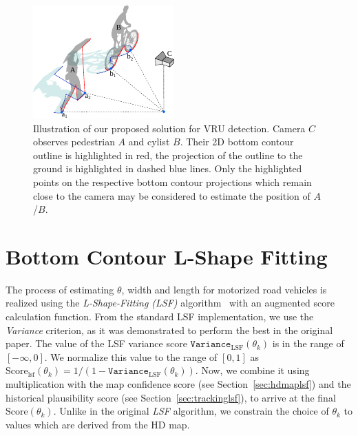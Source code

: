 \begin{figure}[htb]
    \centering
    \includegraphics[width=0.8\linewidth]{figures/vru-detection}
    \caption{Illustration of our proposed solution for VRU detection. Camera $C$ observes pedestrian $A$ and cylist $B$. Their 2D bottom contour outline is highlighted in red, the projection of the outline to the ground is highlighted in dashed blue lines. Only the highlighted points on the respective bottom contour projections which remain close to the camera may be considered to estimate the position of $A$/$B$.}
    \label{fig:mono3d-vru}
\end{figure}

\section{Bottom Contour L-Shape Fitting}
\label{sec:botcontlsf}

The process of estimating $\theta$, width and length for motorized road vehicles is realized using the \textit{L-Shape-Fitting (LSF)} algorithm~\cite{zhang2017efficient} with an augmented score calculation function.
From the standard LSF implementation, we use the \textit{Variance} criterion, as it was demonstrated to perform the best in the original paper.
The value of the LSF variance score $\mathtt{Variance}_{\text{LSF}}(\theta_k)$ is in the range of $[-\infty, 0]$.
We normalize this value to the range of $[0, 1]$ as $\text{Score}_\text{lsf}(\theta_k)=1 / (1 - \mathtt{Variance}_{\text{LSF}}(\theta_k))$.
Now, we combine it using multiplication with the map confidence score (see Section~{\ref{sec:hdmaplsf}}) and the historical plausibility score (see Section~{\ref{sec:trackinglsf}}), to arrive at the final  $\text{Score}(\theta_k)$.
Unlike in the original \textit{LSF} algorithm, we constrain the choice of $\theta_k$ to values which are derived from the HD map.

